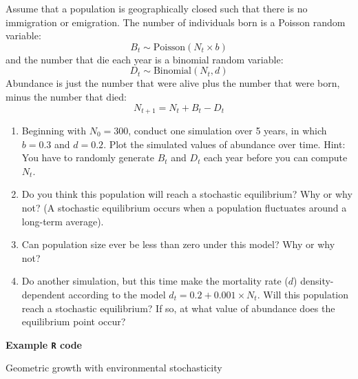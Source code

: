 \documentclass[12pt]{article}\usepackage[]{graphicx}\usepackage[]{color}
\begin{document}
Assume that a population is geographically closed such that there is
no immigration or emigration. The number of individuals born is a
Poisson random variable:
\[
  B_t \sim \mathrm{Poisson}(N_t \times b)
\]
and the number that die each year is a binomial random variable:
\[
  D_t \sim \mathrm{Binomial}(N_t, d)
\]
Abundance is just the number that were alive plus the number that were
born, minus the number that died:
\[
  N_{t+1} = N_t + B_t - D_t
\]
\begin{enumerate}
  \item Beginning with $N_0=300$, conduct one simulation over 5
    years, in which $b=0.3$ and $d=0.2$. Plot the simulated values of
    abundance over time. Hint: You have  
    to randomly generate $B_t$ and $D_t$ each year before you can compute
    $N_t$.
  \item Do you think this population will reach a stochastic
    equilibrium? Why or why not? (A stochastic equilibrium occurs when
    a population fluctuates around a long-term average).
  \item Can population size ever be less than zero under this model?
    Why or why not?
  \item Do another simulation, but this time make the mortality rate
    ($d$) density-dependent according to the model $d_t = 0.2 +
    0.001\times N_t$. Will this population reach a stochastic equilibrium? If
    so, at what value of abundance does the equilibrium point occur?
\end{enumerate}


\newpage

{\bf Example {\tt R} code \\}



Geometric growth with environmental stochasticity
\end{document}
